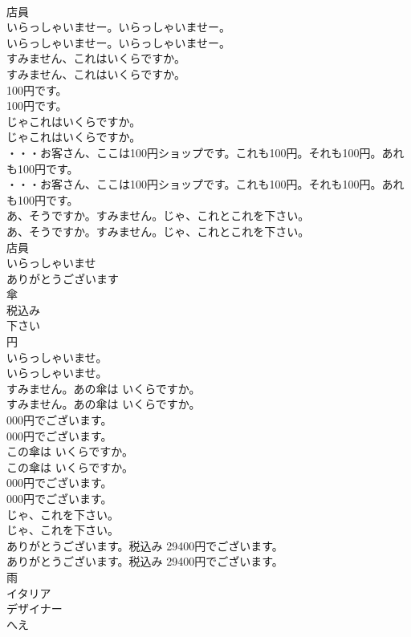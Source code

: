 \documentclass[8pt]{extreport}
\begin{document}
\begin{CJK}{UTF8}{min}
\\	店員
\\	いらっしゃいませー。いらっしゃいませー。	
\\	いらっしゃいませー。いらっしゃいませー。 
\\	すみません、これはいくらですか。	
\\	すみません、これはいくらですか。 
\\	100円です。	
\\	100円です。 
\\	じゃこれはいくらですか。	
\\	じゃこれはいくらですか。 
\\	・・・お客さん、ここは100円ショップです。これも100円。それも100円。あれも100円です。	
\\	・・・お客さん、ここは100円ショップです。これも100円。それも100円。あれも100円です。 
\\	あ、そうですか。すみません。じゃ、これとこれを下さい。	
\\	あ、そうですか。すみません。じゃ、これとこれを下さい。 
\\	店員
\\	いらっしゃいませ
\\	ありがとうございます
\\	傘
\\	税込み
\\	下さい
\\	円
\\	いらっしゃいませ。	
\\	いらっしゃいませ。 
\\	すみません。あの傘は いくらですか。	
\\	すみません。あの傘は いくらですか。 
\\	000円でございます。	
\\	000円でございます。 
\\	この傘は いくらですか。	
\\	この傘は いくらですか。 
\\	000円でございます。	
\\	000円でございます。 
\\	じゃ、これを下さい。	
\\	じゃ、これを下さい。 
\\	ありがとうございます。税込み 29400円でございます。	
\\	ありがとうございます。税込み 29400円でございます。 
\\	雨
\\	イタリア
\\	デザイナー
\\	へえ

\end{CJK}
\end{document}
